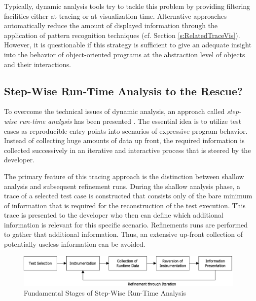 Typically, dynamic analysis tools try to tackle this problem by providing filtering facilities either at tracing or at visualization time.
Alternative approaches automatically reduce the amount of displayed information through the application of pattern recognition techniques (cf. Section \ref{s:RelatedTraceVis}).
However, it is questionable if this strategy is sufficient to give an adequate insight into the behavior of object-oriented programs at the abstraction level of objects and their interactions.

\subsection{Step-Wise Run-Time Analysis to the Rescue?}
\label{ss:BackgroundTracing}
To overcome the technical issues of dynamic analysis, an approach called \emph{step-wise run-time analysis} has been presented \citep{perscheid_immediacy_2010, perscheid_test-driven_2013}.
The essential idea is to utilize test cases as reproducible entry points into scenarios of expressive program behavior.
Instead of collecting huge amounts of data up front, the required information is collected successively in an iterative and interactive process that is steered by the developer.

The primary feature of this tracing approach is the distinction between shallow analysis and subsequent refinement runs.
During the shallow analysis phase, a trace of a selected test case is constructed that consists only of the bare minimum of information that is required for the reconstruction of the test execution.
This trace is presented to the developer who then can define which additional information is relevant for this specific scenario.
Refinements runs are performed to gather that additional information.
Thus, an extensive up-front collection of potentially useless information can be avoided.

\begin{figure}[tb]
	\centering
	\includegraphics[width=1.0\textwidth]{../images/02-TracingProcess}
	\caption{Fundamental Stages of Step-Wise Run-Time Analysis}
	\label{fig:BackgroundTracingApproach}
\end{figure}

